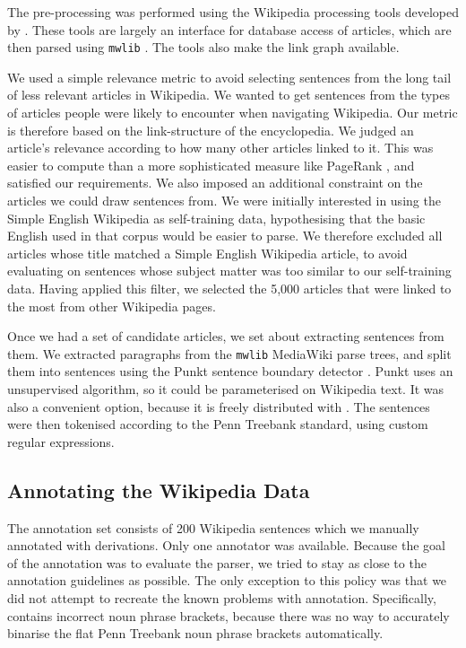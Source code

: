 The pre-processing was performed using the Wikipedia processing tools developed
by \citet{nothman:09}. These tools are largely an interface for database access
of articles, which are then parsed using \texttt{mwlib} \citep{mwlib}. The tools
also make the link graph available.

We used a simple relevance metric to avoid selecting sentences from the long
tail of less relevant articles in Wikipedia. We wanted to get sentences from the
types of articles people were likely to encounter when navigating Wikipedia. Our
metric is therefore based on the link-structure of the encyclopedia. We judged
an article's relevance according to how many other articles linked to it. This
was easier to compute than a more sophisticated measure like PageRank
\citep{pagerank}, and satisfied our requirements. We also imposed an additional
constraint on the articles we could draw sentences from. We were initially
interested in using the Simple English Wikipedia as self-training data,
hypothesising that the basic English used in that corpus would be easier to
parse. We therefore excluded all articles whose title matched a Simple English
Wikipedia article, to avoid evaluating on sentences whose subject matter was too
similar to our self-training data. Having applied this filter, we selected the
5,000 articles that were linked to the most from other Wikipedia pages.

Once we had a set of candidate articles, we set about extracting sentences from
them. We extracted paragraphs from the \texttt{mwlib} MediaWiki parse trees, and
split them into sentences using the Punkt sentence boundary detector
\citep{punkt}. Punkt uses an unsupervised algorithm, so it could be
parameterised on Wikipedia text. It was also a convenient option, because it is
freely distributed with \nltk \citep{nltkbook:09,nltkweb}. The sentences were
then tokenised according to the Penn Treebank standard, using custom regular
expressions.

\subsection{Annotating the Wikipedia Data}

The \wikieval annotation set consists of 200 Wikipedia sentences which we
manually annotated with \ccg derivations. Only one annotator was available.
Because the goal of the annotation was to evaluate the \candc parser, we tried
to stay as close to the \ccgbank annotation guidelines \citep{hock:thesis03} as
possible. The only exception to this policy was that we did not attempt to
recreate the known problems with \ccgbank annotation. Specifically, \ccgbank
contains incorrect noun phrase brackets, because there was no way to accurately
binarise the flat Penn Treebank noun phrase brackets automatically.

